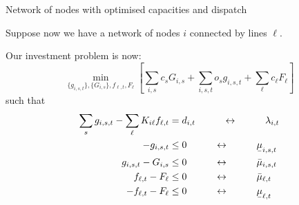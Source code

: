 \documentclass[10pt,dvipsnames]{beamer}
\def\l{\lambda}
\def\m{\mu}
\newcommand{\ubar}[1]{\text{\b{$#1$}}}
\begin{document}
\begin{frame}{Network of nodes with optimised capacities and dispatch}

  Suppose now we have a network of nodes $i$ connected by lines $\ell$.

  Our investment problem is now:
    \begin{equation*}
    \min_{\{g_{i,s,t}\},\{G_{i,s}\}, f_{\ell,t}, F_\ell}  \left[\sum_{i,s}c_s G_{i,s} +  \sum_{i,s,t} o_{s} g_{i,s,t}  + \sum_\ell c_\ell F_\ell \right]
  \end{equation*}
  such that
  \begin{align*}
    \sum_s g_{i,s,t} - \sum_\ell K_{i\ell}f_{\ell,t} & = d_{i,t}  \hspace{1cm}\leftrightarrow\hspace{1cm} \l_{i,t} \\
    - g_{i,s,t}  & \leq  0  \hspace{1cm}\leftrightarrow\hspace{1cm} \ubar{\m}_{i,s,t} \\
    g_{i,s,t} - G_{i,s}  & \leq 0  \hspace{1cm}\leftrightarrow\hspace{1cm} \bar{\m}_{i,s,t} \\
    f_{\ell,t} - F_\ell & \leq 0  \hspace{1cm}\leftrightarrow\hspace{1cm} \bar{\m}_{\ell,t} \\
        - f_{\ell,t} - F_\ell & \leq 0  \hspace{1cm}\leftrightarrow\hspace{1cm} \ubar{\m}_{\ell,t}
  \end{align*}


\end{frame}
\end{document}
